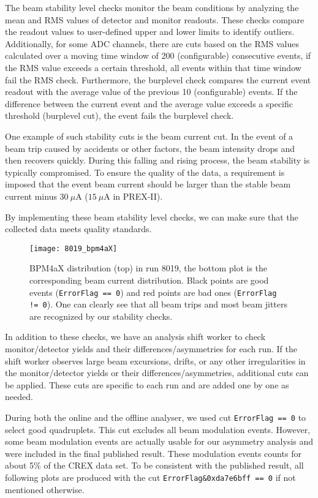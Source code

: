The beam stability level checks monitor the beam conditions by analyzing the
mean and RMS values of detector and monitor readouts. These checks compare the 
readout values to user-defined upper and lower limits to identify outliers. 
Additionally, for some ADC channels, there are cuts based on the RMS values 
calculated over a moving time window of 200 (configurable) %
consecutive events, if the RMS value exceeds a certain threshold,
all events within that time window fail the RMS check. 
Furthermore, the burplevel check compares the current event readout with the average
value of the previous 10 (configurable) events. If the difference between the 
current event and the average value exceeds a specific threshold (burplevel cut),
the event fails the burplevel check. 

One example of such stability cuts is the beam current cut. In the event of a
beam trip caused by accidents or other factors, the beam intensity drops and 
then recovers quickly. During this falling and rising process, the beam stability
is typically compromised. To ensure the quality of the data, a requirement is imposed that the event beam current should be larger than the stable beam current minus $30\ \mu$A ($15\ \mu$A in PREX-II).

By implementing these beam stability level checks, we can make sure that the collected
data meets quality standards.
\begin{figure}[!h]
    \centering
    \texttt{[image: 8019\_bpm4aX]}
    \caption[BPM4aX distribution in run 8019]
    {BPM4aX distribution (top) in run 8019, the bottom plot is the corresponding
    beam current distribution. Black points are good events (\texttt{ErrorFlag == 0}) 
    and red points are bad ones (\texttt{ErrorFlag != 0}). 
    One can clearly see that all beam trips and most beam jitters are recognized 
    by our stability checks.}
\end{figure}

In addition to these checks, we have an analysis shift worker to check monitor/detector 
yields and their differences/asymmetries for each run. If the shift worker observes large beam excursions, drifts, or any other irregularities in the monitor/detector yields or their differences/asymmetries, additional cuts can be applied. These cuts are specific to each run and are added one by one as needed. 

During both the online and the offline analyser, we used cut \verb|ErrorFlag == 0|
to select good quadruplets. This cut excludes all beam modulation events. However, 
some beam modulation events are actually usable for our asymmetry analysis and were
included in the final published result. These modulation events counts for about 
5\% of the CREX data set.
To be consistent with the published result, all following plots are produced with the cut 
\verb|ErrorFlag&0xda7e6bff == 0| if not mentioned otherwise. 

